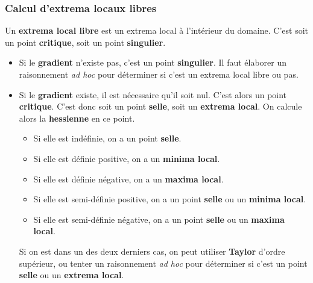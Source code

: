 \subsubsection{Calcul d'extrema locaux libres}
Un \textbf{extrema local libre} est un extrema local à l'intérieur du domaine.
C'est soit un point \textbf{critique}, soit un point \textbf{singulier}.
\begin{itemize}
	\item Si le \textbf{gradient} n'existe pas, c'est un point \textbf{singulier}.
		Il faut élaborer un raisonnement \emph{ad hoc} pour déterminer si c'est un extrema local libre ou pas.
	\item Si le \textbf{gradient} existe, il est nécessaire qu'il soit nul.
		C'est alors un point \textbf{critique}.
		C'est donc soit un point \textbf{selle}, soit un \textbf{extrema local}.
		On calcule alors la \textbf{hessienne} en ce point.
		\begin{itemize}
			\item Si elle est indéfinie, on a un point \textbf{selle}.
			\item Si elle est définie positive, on a un \textbf{minima local}.
			\item Si elle est définie négative, on a un \textbf{maxima local}.
			\item Si elle est semi-définie positive, on a un point \textbf{selle} ou un \textbf{minima local}.
			\item Si elle est semi-définie négative, on a un point \textbf{selle} ou un \textbf{maxima local}.
		\end{itemize}
		Si on est dans un des deux derniers cas, on peut utiliser \textbf{Taylor} d'ordre supérieur, ou tenter un raisonnement \emph{ad hoc} pour déterminer si c'est un point \textbf{selle} ou un \textbf{extrema local}.
\end{itemize}

